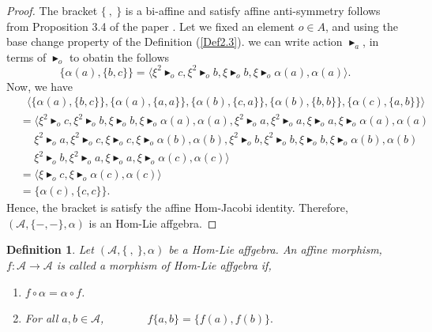 \documentclass[14pt]{article}
\theoremstyle{Definition}
\newtheorem{Def}[thm]{Definition}
\theoremstyle{remark}
\begin{document}
\begin{proof}
The bracket $\{~,~\}$ is a bi-affine and satisfy affine anti-symmetry follows from Proposition 3.4 of the paper \cite{Brz1}. Let we fixed an element $o\in A$, and using the base change property of the Definition (\ref{Def2.3}). we can write action $\blacktriangleright_{a}$, in terms of $\blacktriangleright_{o}$ to obatin the follows 
$$
\{\alpha(a),\{b,c\}\}=\langle \xi^{2}\blacktriangleright_{o}c,\xi^{2}\blacktriangleright_{o}b,\xi\blacktriangleright_{o}b,\xi\blacktriangleright_{o}\alpha(a),\alpha(a)\rangle.
$$
Now, we have
\begin{align*}
&~~~\langle\{\alpha(a),\{b,c\}\},\{\alpha(a),\{a,a\}\},\{\alpha(b),\{c,a\}\},\{\alpha(b),\{b,b\}\},\{\alpha(c),\{a,b\}\}\rangle\\
&=\langle \xi^{2}\blacktriangleright_{o}c,\xi^{2}\blacktriangleright_{o}b,\xi\blacktriangleright_{o}b,\xi\blacktriangleright_{o}\alpha(a),\alpha(a), \xi^{2}\blacktriangleright_{o}a,\xi^{2}\blacktriangleright_{o}a,\xi\blacktriangleright_{o}a,\xi\blacktriangleright_{o}\alpha(a),\alpha(a)\\
&~~~~~~ \xi^{2}\blacktriangleright_{o}a,\xi^{2}\blacktriangleright_{o}c,\xi\blacktriangleright_{o}c,\xi\blacktriangleright_{o}\alpha(b),\alpha(b), \xi^{2}\blacktriangleright_{o}b,\xi^{2}\blacktriangleright_{o}b,\xi\blacktriangleright_{o}b,\xi\blacktriangleright_{o}\alpha(b),\alpha(b)\\
&~~~~~~
\xi^{2}\blacktriangleright_{o}b,\xi^{2}\blacktriangleright_{o}a,\xi\blacktriangleright_{o}a,\xi\blacktriangleright_{o}\alpha(c),\alpha(c)\rangle\\
&=\langle\xi\blacktriangleright_{o}c,\xi\blacktriangleright_{o}\alpha(c),\alpha(c)\rangle\\
&=\{\alpha(c),\{c,c\}\}.
\end{align*}
Hence, the bracket is satisfy the affine Hom-Jacobi identity. Therefore, $(\mathcal{A},\{-,-\},\alpha)$ is an Hom-Lie affgebra. 
\end{proof}
\begin{Def}
Let $(\mathcal{A},\{~,~\},\alpha)$ be a Hom-Lie affgebra. An affine morphism, $f:\mathcal{A}\rightarrow \mathcal{A}$ is called a morphism of Hom-Lie affgebra if, 
\begin{enumerate}
\item[(i)] $f\circ\alpha=\alpha\circ f$.
\item[(ii)] For all $a,b\in \mathcal{A}$,~~~~~~~
$
f\{a,b\}=\{f(a),f(b)\}.
$
\end{enumerate}
\end{Def}
\end{document}
